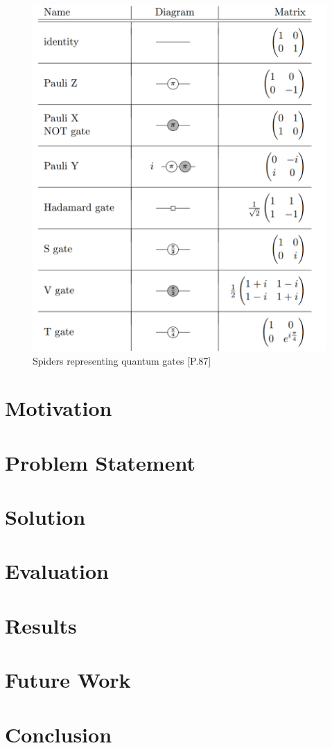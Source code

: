 \documentclass[conference]{IEEEtran}
\begin{document}
\begin{figure}
    \includegraphics[width=\linewidth]{images/single_spider_unitaries.png}
    \caption{Spiders representing quantum gates
            {\cite{vandewetering2020zxcalculus}[P.87]}}
    \label{fig:spiders}
\end{figure}














\section{Motivation}


\section{Problem Statement}

\section{Solution}

\section{Evaluation}

\section{Results}

\section{Future Work}

\section{Conclusion}





\end{document}

